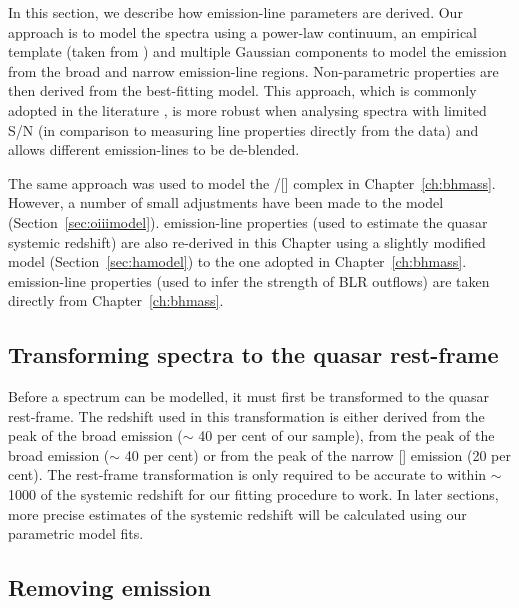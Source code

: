 In this section, we describe how emission-line parameters are derived. 
Our approach is to model the spectra using a power-law continuum, an empirical  template (taken from \citealt{boroson92}) and multiple Gaussian components to model the emission from the broad and narrow emission-line regions.
Non-parametric properties are then derived from the best-fitting model. 
This approach, which is commonly adopted in the literature \citep[e.g.][]{shen11,shen12,shen16a}, is more robust when analysing spectra with limited S/N (in comparison to measuring line properties directly from the data) and allows different emission-lines to be de-blended.

The same approach was used to model the \hbns/[] complex in Chapter~\ref{ch:bhmass}. 
However, a number of small adjustments have been made to the model (Section~\ref{sec:oiiimodel}). 
\ha emission-line properties (used to estimate the quasar systemic redshift) are also re-derived in this Chapter using a slightly modified model (Section~\ref{sec:hamodel}) to the one adopted in Chapter~\ref{ch:bhmass}. 
 emission-line properties (used to infer the strength of BLR outflows) are taken directly from Chapter~\ref{ch:bhmass}. 

\subsection{Transforming spectra to the quasar rest-frame}

Before a spectrum can be modelled, it must first be transformed to the quasar rest-frame.  
The redshift used in this transformation is either derived from the peak of the broad \ha emission ($\sim$ 40 per cent of our sample), from the peak of the broad \hb emission ($\sim$ 40 per cent) or from the peak of the narrow [] emission (20 per cent).
The rest-frame transformation is only required to be accurate to within $\sim$1000 \kms of the systemic redshift for our fitting procedure to work. 
In later sections, more precise estimates of the systemic redshift will be calculated using our parametric model fits. 

\subsection{Removing  emission}

